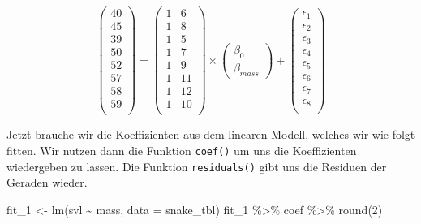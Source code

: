 \documentclass[
  letterpaper,
]{scrbook}
\newenvironment{Shaded}{\begin{snugshade}}{\end{snugshade}}
\newcommand{\AttributeTok}[1]{\textcolor[rgb]{0.40,0.45,0.13}{#1}}
\newcommand{\DecValTok}[1]{\textcolor[rgb]{0.68,0.00,0.00}{#1}}
\newcommand{\FunctionTok}[1]{\textcolor[rgb]{0.28,0.35,0.67}{#1}}
\newcommand{\NormalTok}[1]{\textcolor[rgb]{0.00,0.23,0.31}{#1}}
\newcommand{\OtherTok}[1]{\textcolor[rgb]{0.00,0.23,0.31}{#1}}
\newcommand{\SpecialCharTok}[1]{\textcolor[rgb]{0.37,0.37,0.37}{#1}}
\begin{document}
\[
 \begin{pmatrix}
  40 \\
  45 \\
  39 \\
  50 \\
  52 \\
  57 \\
  58 \\
  59 \\
 \end{pmatrix}
 =
  \begin{pmatrix}
  1 & 6 \\
  1 & 8 \\
  1 & 5 \\
  1 & 7 \\
  1 & 9 \\
  1 & 11\\
  1 & 12\\
  1 & 10\\
 \end{pmatrix}
 \times
  \begin{pmatrix}
  \beta_0 \\
  \beta_{mass} 
 \end{pmatrix} +
  \begin{pmatrix}
  \epsilon_1 \\
  \epsilon_2 \\
  \epsilon_3 \\
  \epsilon_4 \\
  \epsilon_5 \\
  \epsilon_6 \\
  \epsilon_7 \\
  \epsilon_8 \\
 \end{pmatrix}
\]

Jetzt brauche wir die Koeffizienten aus dem linearen Modell, welches wir
wie folgt fitten. Wir nutzen dann die Funktion \texttt{coef()} um uns
die Koeffizienten wiedergeben zu lassen. Die Funktion
\texttt{residuals()} gibt uns die Residuen der Geraden wieder.

\begin{Shaded}
\begin{Highlighting}[]
\NormalTok{fit\_1 }\OtherTok{\textless{}{-}} \FunctionTok{lm}\NormalTok{(svl }\SpecialCharTok{\textasciitilde{}}\NormalTok{ mass, }\AttributeTok{data =}\NormalTok{ snake\_tbl) }
\NormalTok{fit\_1 }\SpecialCharTok{\%\textgreater{}\%}\NormalTok{ coef }\SpecialCharTok{\%\textgreater{}\%} \FunctionTok{round}\NormalTok{(}\DecValTok{2}\NormalTok{)}
\end{Highlighting}
\end{Shaded}
\end{document}
